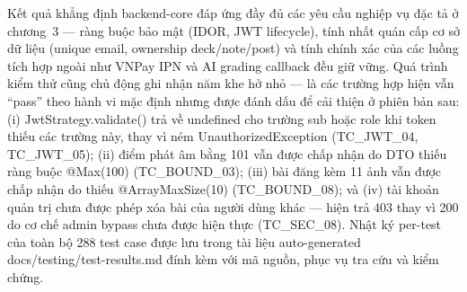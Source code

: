 Kết quả khẳng định backend-core đáp ứng đầy đủ các yêu cầu nghiệp vụ đặc tả ở chương~3 --- ràng buộc bảo mật (IDOR, JWT lifecycle), tính nhất quán cấp cơ sở dữ liệu (unique email, ownership deck/note/post) và tính chính xác của các luồng tích hợp ngoài như VNPay IPN và AI grading callback đều giữ vững. Quá trình kiểm thử cũng chủ động ghi nhận năm khe hở nhỏ --- là các trường hợp hiện vẫn ``pass'' theo hành vi mặc định nhưng được đánh dấu để cải thiện ở phiên bản sau: (i) JwtStrategy.validate() trả về undefined cho trường sub hoặc role khi token thiếu các trường này, thay vì ném UnauthorizedException (TC\_JWT\_04, TC\_JWT\_05); (ii) điểm phát âm bằng 101 vẫn được chấp nhận do DTO thiếu ràng buộc @Max(100) (TC\_BOUND\_03); (iii) bài đăng kèm 11 ảnh vẫn được chấp nhận do thiếu @ArrayMaxSize(10) (TC\_BOUND\_08); và (iv) tài khoản quản trị chưa được phép xóa bài của người dùng khác --- hiện trả 403 thay vì 200 do cơ chế admin bypass chưa được hiện thực (TC\_SEC\_08). Nhật ký per-test của toàn bộ 288 test case được lưu trong tài liệu auto-generated docs/testing/test-results.md đính kèm với mã nguồn, phục vụ tra cứu và kiểm chứng.


